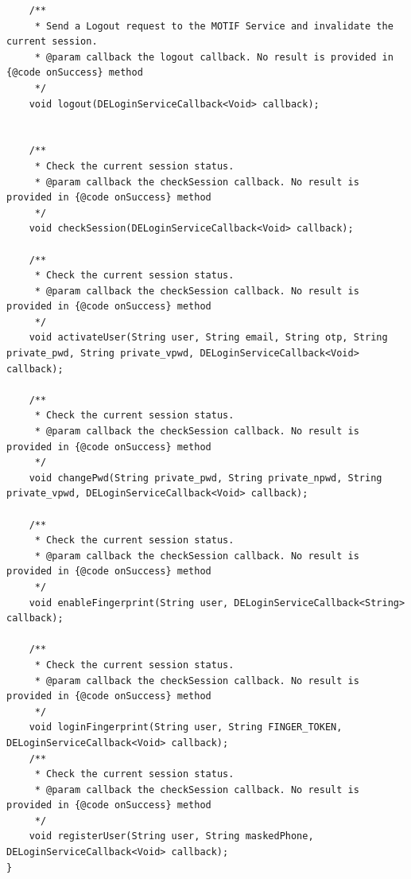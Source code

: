\documentclass[a4paper, 12pt]{article}
\newenvironment{code}{\captionsetup{type=listing}}{}
\begin{document}
\begin{code}
\begin{verbatim}
    /**
     * Send a Logout request to the MOTIF Service and invalidate the current session.
     * @param callback the logout callback. No result is provided in {@code onSuccess} method
     */
    void logout(DELoginServiceCallback<Void> callback);


    /**
     * Check the current session status.
     * @param callback the checkSession callback. No result is provided in {@code onSuccess} method
     */
    void checkSession(DELoginServiceCallback<Void> callback);

    /**
     * Check the current session status.
     * @param callback the checkSession callback. No result is provided in {@code onSuccess} method
     */
    void activateUser(String user, String email, String otp, String private_pwd, String private_vpwd, DELoginServiceCallback<Void> callback);

    /**
     * Check the current session status.
     * @param callback the checkSession callback. No result is provided in {@code onSuccess} method
     */
    void changePwd(String private_pwd, String private_npwd, String private_vpwd, DELoginServiceCallback<Void> callback);

    /**
     * Check the current session status.
     * @param callback the checkSession callback. No result is provided in {@code onSuccess} method
     */
    void enableFingerprint(String user, DELoginServiceCallback<String> callback);

    /**
     * Check the current session status.
     * @param callback the checkSession callback. No result is provided in {@code onSuccess} method
     */
    void loginFingerprint(String user, String FINGER_TOKEN, DELoginServiceCallback<Void> callback);
    /**
     * Check the current session status.
     * @param callback the checkSession callback. No result is provided in {@code onSuccess} method
     */
    void registerUser(String user, String maskedPhone, DELoginServiceCallback<Void> callback);
}

\end{verbatim}
\end{code}
\bigbreak
\end{document}

